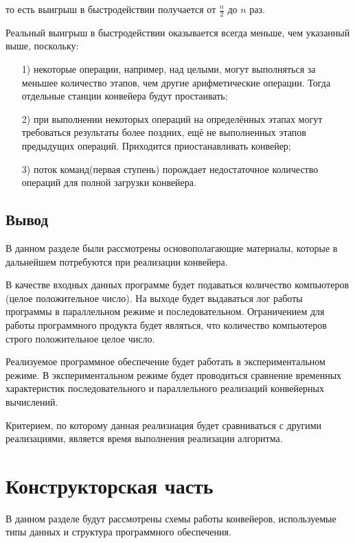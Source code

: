 то есть выигрыш в быстродействии получается от $\frac{n}{2}$  до $n$ раз.

Реальный выигрыш в быстродействии оказывается всегда меньше, чем указанный выше, поскольку:

\begin{enumerate}
\item[1)] некоторые операции, например, над целыми, могут выполняться за меньшее количество этапов, чем другие арифметические операции. Тогда отдельные станции конвейера будут простаивать;
\item[2)] при выполнении некоторых операций на определённых этапах могут требоваться результаты более поздних, ещё не выполненных этапов предыдущих операций. Приходится приостанавливать конвейер;
\item[3)] поток команд(первая ступень) порождает недостаточное количество операций для полной загрузки конвейера.
\end{enumerate}


\subsection{Вывод}

В данном разделе были рассмотрены
основополагающие материалы, которые в дальнейшем потребуются
при реализации конвейера.

В качестве входных данных программе будет подаваться количество компьютеров (целое положительное число). На выходе будет выдаваться лог работы программы в параллельном режиме и последовательном. Ограничением для работы программного продукта будет являться, что количество компьютеров строго положительное целое число.

Реализуемое программное обеспечение будет работать в экспериментальном режиме. В экспериментальном режиме будет проводиться сравнение временных характеристик последовательного и параллельного реализаций конвейерных вычислений.

Критерием, по которому данная реализиация будет сравниваться с другими реализациями, является время выполнения реализации алгоритма.

\section{Конструкторская часть}

В данном разделе будут рассмотрены схемы работы конвейеров, используемые типы данных и структура программного обеспечения.

